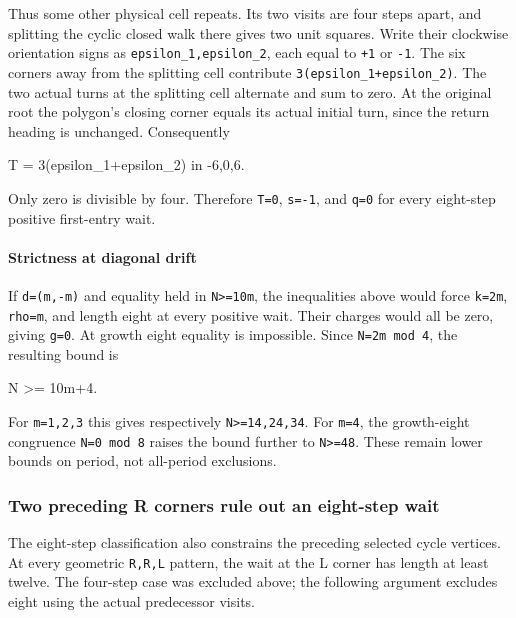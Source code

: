 \documentclass[11pt,letterpaper]{article}
\theoremstyle{plain}
\theoremstyle{definition}
\begin{document}
\begin{NoHyper}
Thus some other physical cell repeats. Its two visits are four steps apart, and splitting the cyclic closed walk there gives two unit squares. Write their clockwise orientation signs as \texttt{epsilon\_1,epsilon\_2}, each equal to \texttt{+1} or \texttt{-1}. The six corners away from the splitting cell contribute \texttt{3(epsilon\_1+epsilon\_2)}. The two actual turns at the splitting cell alternate and sum to zero. At the original root the polygon's closing corner equals its actual initial turn, since the return heading is unchanged. Consequently

\begin{codeblock}
T = 3(epsilon_1+epsilon_2) in {-6,0,6}.
\end{codeblock}

Only zero is divisible by four. Therefore \texttt{T=0}, \texttt{s=-1}, and \texttt{q=0} for every eight-step positive first-entry wait.

\paragraph{Strictness at diagonal drift}

If \texttt{d=(m,-m)} and equality held in \texttt{N\textgreater{}=10m}, the inequalities above would force \texttt{k=2m}, \texttt{rho=m}, and length eight at every positive wait. Their charges would all be zero, giving \texttt{g=0}. At growth eight equality is impossible. Since \texttt{N=2m\ mod\ 4}, the resulting bound is

\begin{codeblock}
N >= 10m+4.
\end{codeblock}

For \texttt{m=1,2,3} this gives respectively \texttt{N\textgreater{}=14,24,34}. For \texttt{m=4}, the growth-eight congruence \texttt{N=0\ mod\ 8} raises the bound further to \texttt{N\textgreater{}=48}. These remain lower bounds on period, not all-period exclusions.

\subsubsection{Two preceding R corners rule out an eight-step wait}

The eight-step classification also constrains the preceding selected cycle vertices. At every geometric \texttt{R,R,L} pattern, the wait at the L corner has length at least twelve. The four-step case was excluded above; the following argument excludes eight using the actual predecessor visits.


\end{NoHyper}
\end{document}
